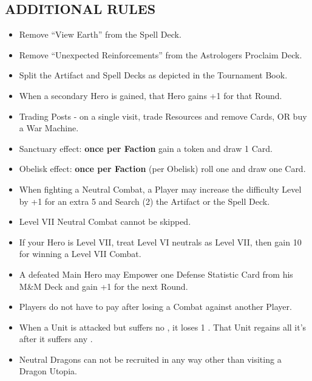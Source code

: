 \begin{multicols*}{2}
\subsection*{\MakeUppercase{Additional Rules}}
\begin{itemize}
  \item Remove ``View Earth'' from the Spell Deck.
  \item Remove ``Unexpected Reinforcements'' from the Astrologers Proclaim Deck.
  \item Split the Artifact and Spell Decks as depicted in the Tournament Book. %
  \item When a secondary Hero is gained, that Hero gains +1  for that Round.
  \item Trading Posts - on a single visit, trade Resources and remove Cards, OR buy a War Machine.
  \item Sanctuary effect: \textbf{once per Faction} gain a  token and draw 1 Card.
  \item Obelisk effect: \textbf{once per Faction} (per Obelisk) roll one  and draw one Card.
  \item When fighting a Neutral Combat, a Player may increase the difficulty Level by +1 for an extra 5  and Search (2) the Artifact or the Spell Deck.
  \item Level VII Neutral Combat cannot be skipped.
  \item If your Hero is Level VII, treat Level VI neutrals as Level VII, then gain 10  for winning a Level VII Combat.
  \item A defeated Main Hero may Empower one Defense Statistic Card from his M\&M Deck and gain +1  for the next Round.
  \item Players do not have to pay  after losing a Combat against another Player.
  \item When a Unit is attacked but suffers no , it loses 1 . That Unit regains all it's  after it suffers any .
  \item Neutral Dragons can not be recruited in any way other than visiting a Dragon Utopia.


\end{itemize}
\end{multicols*}
